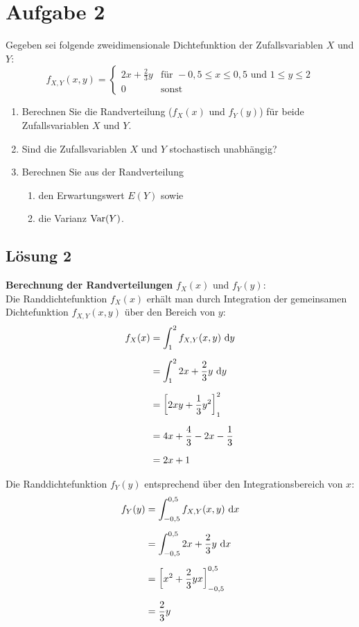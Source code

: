 \documentclass[main.tex]{subfiles}
\begin{document}
\section{Aufgabe 2}
Gegeben sei folgende zweidimensionale Dichtefunktion der Zufallsvariablen $X$ und $Y$:
$$ f_{X,Y}(x,y)
= \begin{cases}
	2x + \frac{2}{3}y & \mbox{für } -0,5 \leq x \leq 0,5 \mbox{ und } 1 \leq y \leq 2 \\
	0				  & \mbox{sonst}
\end{cases} $$

\begin{enumerate}
\item Berechnen Sie die Randverteilung ($f_X(x)$ und $f_Y(y)$) für beide Zufallsvariablen $X$ und $Y$.
\item Sind die Zufallsvariablen $X$ und $Y$ stochastisch unabhängig?
\item Berechnen Sie aus der Randverteilung
\begin{enumerate}
\item den Erwartungswert $E(Y)$ sowie
\item die Varianz $\operatorname{Var}(Y)$.
\end{enumerate}
\end{enumerate}

\subsection{Lösung 2}

\textbf{Berechnung der Randverteilungen} \(f_X(x)\) und \(f_Y(y)\):\\
Die Randdichtefunktion \(f_X(x)\) erhält man durch Integration der gemeinsamen Dichtefunktion \(f_{X,Y}(x,y)\) über den Bereich von \(y\):
$$\begin{aligned}
	f_X(x) &= \int_{1}^{2} f_{X,Y}(x,y) ~\mathrm{d}y \\[2mm]
	&= \int_{1}^{2} 2x + \frac{2}{3}y ~\mathrm{d}y \\[2mm]
	&= \left[
		2xy + \frac{1}{3}y^2
	\right]_{1}^{2} \\[2mm]
	&= 4x + \frac{4}{3} - 2x - \frac{1}{3} \\[2mm]
	&= 2x + 1
\end{aligned}
$$

Die Randdichtefunktion \(f_Y(y)\) entsprechend über den Integrationsbereich von \(x\):
$$\begin{aligned}
	f_Y(y) &= \int_{-0,5}^{0,5} f_{X,Y}(x,y) ~\mathrm{d}x \\[2mm]
	&= \int_{-0,5}^{0,5} 2x + \frac{2}{3}y ~\mathrm{d}x \\[2mm]
	&= \left[ x^2 + \frac{2}{3}yx \right]_{-0,5}^{0,5} \\[2mm]
	&= \frac{2}{3}y
\end{aligned}$$
\end{document}
